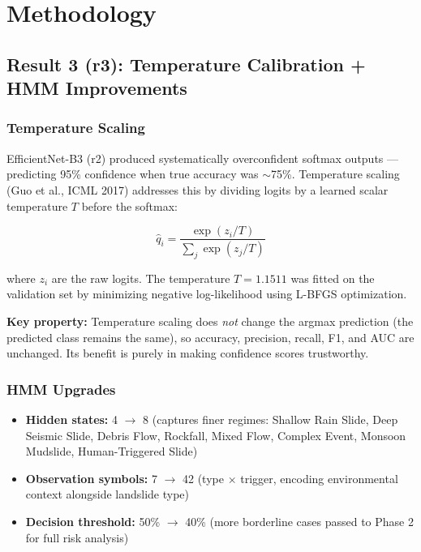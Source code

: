 \documentclass[11pt]{article}
\begin{document}
\section{Methodology}

\subsection{Result 3 (r3): Temperature Calibration + HMM Improvements}

\subsubsection{Temperature Scaling}

EfficientNet-B3 (r2) produced systematically overconfident softmax outputs --- predicting 95\% confidence when true accuracy was $\sim$75\%. Temperature scaling (Guo et al., ICML 2017) addresses this by dividing logits by a learned scalar temperature $T$ before the softmax:

\[
\hat{q}_i = \frac{\exp(z_i / T)}{\sum_j \exp(z_j / T)}
\]

where $z_i$ are the raw logits. The temperature $T = 1.1511$ was fitted on the validation set by minimizing negative log-likelihood using L-BFGS optimization.

\textbf{Key property:} Temperature scaling does \textit{not} change the argmax prediction (the predicted class remains the same), so accuracy, precision, recall, F1, and AUC are unchanged. Its benefit is purely in making confidence scores trustworthy.

\subsubsection{HMM Upgrades}

\begin{itemize}[noitemsep]
    \item \textbf{Hidden states:} 4 $\to$ 8 (captures finer regimes: Shallow Rain Slide, Deep Seismic Slide, Debris Flow, Rockfall, Mixed Flow, Complex Event, Monsoon Mudslide, Human-Triggered Slide)
    \item \textbf{Observation symbols:} 7 $\to$ 42 (type $\times$ trigger, encoding environmental context alongside landslide type)
    \item \textbf{Decision threshold:} 50\% $\to$ 40\% (more borderline cases passed to Phase 2 for full risk analysis)
\end{itemize}
\end{document}
